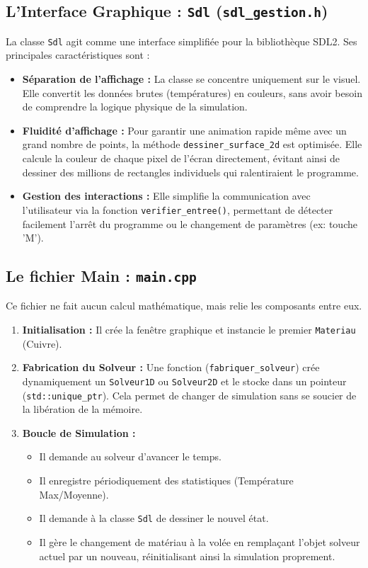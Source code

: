 \documentclass[a4paper,12pt]{article}
\begin{document}
\subsection{L'Interface Graphique : \texttt{Sdl} (\texttt{sdl\_gestion.h})}
La classe \texttt{Sdl} agit comme une interface simplifiée pour la bibliothèque SDL2. Ses principales caractéristiques sont :

\begin{itemize} \item \textbf{Séparation de l'affichage :} La classe se concentre uniquement sur le visuel. Elle convertit les données brutes (températures) en couleurs, sans avoir besoin de comprendre la logique physique de la simulation. \item \textbf{Fluidité d'affichage :} Pour garantir une animation rapide même avec un grand nombre de points, la méthode \texttt{dessiner\_surface\_2d} est optimisée. Elle calcule la couleur de chaque pixel de l'écran directement, évitant ainsi de dessiner des millions de rectangles individuels qui ralentiraient le programme. \item \textbf{Gestion des interactions :} Elle simplifie la communication avec l'utilisateur via la fonction \texttt{verifier\_entree()}, permettant de détecter facilement l'arrêt du programme ou le changement de paramètres (ex: touche 'M'). \end{itemize}


\subsection{Le fichier Main : \texttt{main.cpp}}
Ce fichier ne fait aucun calcul mathématique, mais relie les composants entre eux.
\begin{enumerate}
    \item \textbf{Initialisation :} Il crée la fenêtre graphique et instancie le premier \texttt{Materiau} (Cuivre).
    \item \textbf{Fabrication du Solveur :} Une fonction  (\texttt{fabriquer\_solveur}) crée dynamiquement un \texttt{Solveur1D} ou \texttt{Solveur2D} et le stocke dans un pointeur  (\texttt{std::unique\_ptr}). Cela permet de changer de simulation sans se soucier de la libération de la mémoire.
    \item \textbf{Boucle de Simulation :}
    \begin{itemize}
        \item Il demande au solveur d'avancer le temps.
        \item Il enregistre périodiquement des statistiques (Température Max/Moyenne).
        \item Il demande à la classe \texttt{Sdl} de dessiner le nouvel état.
        \item Il gère le changement de matériau à la volée en remplaçant l'objet solveur actuel par un nouveau, réinitialisant ainsi la simulation proprement.
    \end{itemize}
\end{enumerate}
\end{document}
